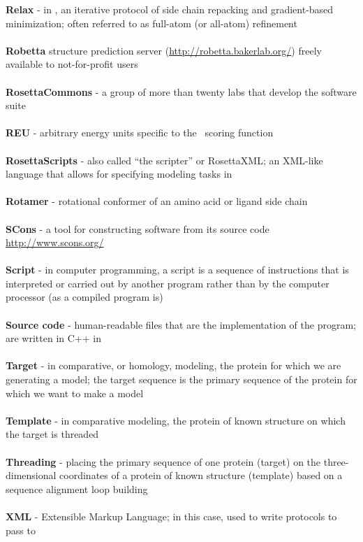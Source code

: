 \textbf{Relax} - in \rosetta, an iterative protocol of side chain repacking and gradient-based minimization; often referred to as full-atom (or all-atom) refinement \\ \\

\textbf{Robetta}  \rosetta structure prediction server (\url{http://robetta.bakerlab.org/}) freely available to not-for-profit users \\ \\

\textbf{RosettaCommons} - a group of more than twenty labs that develop the \rosetta software suite  \\ \\

\textbf{REU} - arbitrary energy units specific to the \rosetta~scoring function \\ \\

\textbf{RosettaScripts} - also called ``the scripter'' or RosettaXML; an XML-like language that allows for specifying modeling tasks in \rosetta \\ \\

\textbf{Rotamer} - rotational conformer of an amino acid or ligand side chain \\ \\

\textbf{SCons} - a tool for constructing software from its source code \url{http://www.scons.org/} \\ \\

\textbf{Script} - in computer programming, a script is a sequence of instructions that is interpreted or carried out by another program rather than by the computer processor (as a compiled program is) \\ \\

\textbf{Source code} - human-readable files that are the implementation of the program; are written in C++ in \rosetta \\ \\

\textbf{Target} - in comparative, or homology, modeling, the protein for which we are generating a model; the target sequence is the primary sequence of the protein for which we want to make a model \\ \\

\textbf{Template} - in comparative modeling, the protein of known structure on which the target is threaded \\ \\

\textbf{Threading} - placing the primary sequence of one protein (target) on the three-dimensional coordinates of a protein of known structure (template) based on a sequence alignment loop building \\ \\

\textbf{XML} - Extensible Markup Language; in this case, used to write protocols to pass to

\clearpage